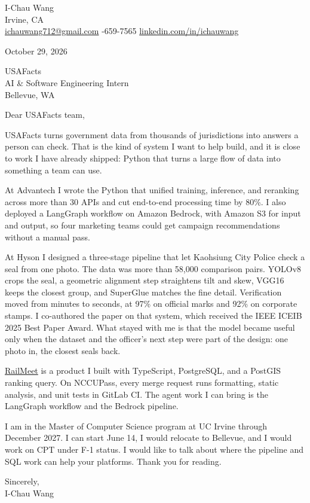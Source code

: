 \documentclass[11pt]{article}
\begin{document}
I-Chau Wang\\
Irvine, CA\\
\href{mailto:ichauwang712@gmail.com}{ichauwang712@gmail.com}
\quad\textbar{}-659-7565
\quad\textbar\quad
\href{https://linkedin.com/in/ichauwang}{linkedin.com/in/ichauwang}

\vspace{1.2em}

October 29, 2026

\vspace{1.2em}

USAFacts\\
AI \& Software Engineering Intern\\
Bellevue, WA

\vspace{1.2em}

Dear USAFacts team,

USAFacts turns government data from thousands of jurisdictions into answers a person can check. That is the kind of system I want to help build, and it is close to work I have already shipped: Python that turns a large flow of data into something a team can use.

At Advantech I wrote the Python that unified training, inference, and reranking across more than 30 APIs and cut end-to-end processing time by 80\%. I also deployed a LangGraph workflow on Amazon Bedrock, with Amazon S3 for input and output, so four marketing teams could get campaign recommendations without a manual pass.

At Hyson I designed a three-stage pipeline that let Kaohsiung City Police check a seal from one photo. The data was more than 58,000 comparison pairs. YOLOv8 crops the seal, a geometric alignment step straightens tilt and skew, VGG16 keeps the closest group, and SuperGlue matches the fine detail. Verification moved from minutes to seconds, at 97\% on official marks and 92\% on corporate stamps. I co-authored the paper on that system, which received the IEEE ICEIB 2025 Best Paper Award. What stayed with me is that the model became useful only when the dataset and the officer's next step were part of the design: one photo in, the closest seals back.

\href{https://github.com/YChaoWang/RailMeet}{RailMeet} is a product I built with TypeScript, PostgreSQL, and a PostGIS ranking query. On NCCUPass, every merge request runs formatting, static analysis, and unit tests in GitLab CI. The agent work I can bring is the LangGraph workflow and the Bedrock pipeline.

I am in the Master of Computer Science program at UC Irvine through December 2027. I can start June 14, I would relocate to Bellevue, and I would work on CPT under F-1 status. I would like to talk about where the pipeline and SQL work can help your platforms. Thank you for reading.

\vspace{1.2em}

Sincerely,\\
I-Chau Wang
\end{document}
